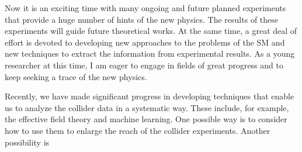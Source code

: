 \documentclass[12pt,notitlepage]{article}
\begin{document}

Now it is an exciting time with many ongoing and future planned experiments that provide a huge number of hints of the new physics.
The results of these experiments will guide future theoretical works.
At the same time, a great deal of effort is devoted to developing new approaches to the problems of the SM and new techniques to extract the information from experimental results.
As a young researcher at this time, I am eager to engage in fields of great progress and to keep seeking a trace of the new physics.

Recently, we have made significant progress in developing techniques that enable us to analyze the collider data in a systematic way.
These include, for example, the effective field theory and machine learning.
One possible way is to consider how to use them to enlarge the reach of the collider experiments.
Another possibility is
\end{document}
